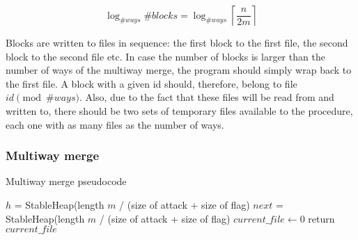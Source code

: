 \documentclass[10pt,a4paper]{article}
\numberwithin{equation}{section}
\begin{document}
\begin{equation}
    \log_{\#ways}{\#blocks} = \log_{\#ways}{\left \lceil{\frac{n}{2m}}\right \rceil}
\end{equation}

Blocks are written to files in sequence: the first block to the first file, the second block to the second file etc. In case the number of blocks is larger than the number of ways of the multiway merge, the program should simply wrap back to the first file. A block with a given id should, therefore, belong to file $id \pmod {\#ways}$. Also, due to the fact that these files will be read from and written to, there should be two sets of temporary files available to the procedure, each one with as many files as the number of ways.

\subsubsection{Multiway merge}

\begin{algorithm}[H]
    \caption{Multiway merge pseudocode}


    \BlankLine
    $h$ = StableHeap(length $m$ / (size of attack + size of flag)\;
    $next$ = StableHeap(length $m$ / (size of attack + size of flag)\;
    $current\_file \leftarrow 0$\;
    return $current\_file$\;
\end{algorithm}
\end{document}
